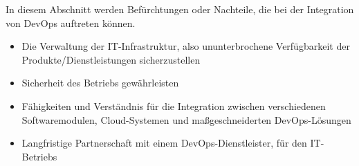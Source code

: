 In diesem Abschnitt werden Befürchtungen oder Nachteile, die bei der Integration von DevOps auftreten können.  

\begin{itemize}

\item Die Verwaltung der IT-Infrastruktur, also ununterbrochene Verfügbarkeit der Produkte/Dienstleistungen sicherzustellen

\item Sicherheit des Betriebs gewährleisten

\item Fähigkeiten und Verständnis für die Integration zwischen verschiedenen Softwaremodulen, Cloud-Systemen und maßgeschneiderten DevOps-Lösungen

\item Langfristige Partnerschaft mit einem DevOps-Dienstleister, für den IT-Betriebs

\end{itemize}